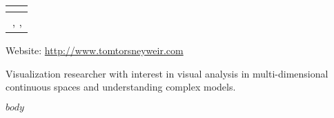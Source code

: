 \documentclass[11pt]{article}
\author{Thomas Torsney-Weir}
\makeatletter
\newcommand*{\theauthor}{}
\newcommand*{\theemail}{}
\newcommand*{\thephone}{}
\newcommand*{\theaddress}{}
\newlength{\mytitlewidth}
\renewcommand*{\maketitle}{%
  \begin{tabular*}{\mytitlewidth}{@{}l@{\extracolsep{\fill}}r@{\extracolsep{0ex}~}}
  \textbf{\large{\theauthor}} &  \\ \hline
  \multicolumn{2}{r}{\theaddress, \thephone, \theemail}
  \end{tabular*}
}
\makeatother
\begin{document}
%
%

\maketitle


Website: \url{http://www.tomtorsneyweir.com}

Visualization researcher with interest in visual analysis in 
multi-dimensional continuous spaces and understanding complex models.

$body$
\end{document}
